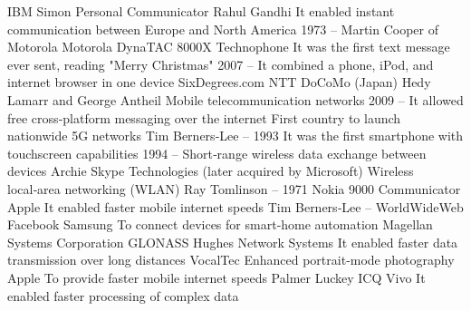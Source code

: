 \answerkey
{} IBM Simon Personal Communicator
 Rahul Gandhi
 It enabled instant communication between Europe and North America
 1973 – Martin Cooper of Motorola
 Motorola DynaTAC 8000X
 Technophone
 It was the first text message ever sent, reading "Merry Christmas"
 2007 – It combined a phone, iPod, and internet browser in one device
 SixDegrees.com
 NTT DoCoMo (Japan)
 Hedy Lamarr and George Antheil
 Mobile telecommunication networks
 2009 – It allowed free cross‑platform messaging over the internet
 First country to launch nationwide 5G networks
 Tim Berners‑Lee – 1993
 It was the first smartphone with touchscreen capabilities
 1994 – Short‑range wireless data exchange between devices
 Archie
 Skype Technologies (later acquired by Microsoft)
 Wireless local‑area networking (WLAN)
 Ray Tomlinson – 1971
 Nokia 9000 Communicator
 Apple
 It enabled faster mobile internet speeds
 Tim Berners‑Lee – WorldWideWeb
 Facebook
 Samsung
 To connect devices for smart‑home automation
 Magellan Systems Corporation
 GLONASS
 Hughes Network Systems
 It enabled faster data transmission over long distances
 VocalTec
 Enhanced portrait‑mode photography
 Apple
 To provide faster mobile internet speeds
 Palmer Luckey
 ICQ
 Vivo
 It enabled faster processing of complex data
\endanswerkey
